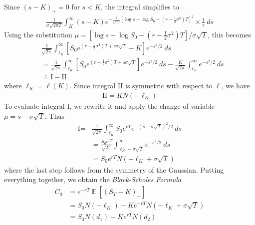 \documentclass[12pt]{article}
\DeclareMathOperator{\ex}{\mathbb{E}}
\theoremstyle{plain}
\theoremstyle{definition}
\theoremstyle{remark}
\numberwithin{equation}{section}  %
\begin{document}
Since ${(s-K)}_{+} = 0$ for $s < K$, the integral simplifies to
\begin{equation*}
\begin{split}
\frac{1}{\sigma \sqrt{2 \pi T}} \int_{K}^{\infty}{(s- K)}
	e^{- \frac{1}{2 \sigma^{2} T} \left[ \log s - \log S_{0} - (r - \frac{1}{2}
	\sigma^{2})T \right]^{2}} \times \frac{1}{s}  \ ds
\end{split}
\end{equation*}
Using the substitution $\mu = \left [ \log s - \log S_{0} - (r - \frac{1}{2}
\sigma^{2})T \right ]/\sigma \sqrt{T}$, this becomes
\begin{equation*}
\begin{split}
	& \frac{1}{\sqrt{2 \pi}} \int_{\ell_{K}}^{\infty}
\left [ S_{0}e^{(r - \frac{1}{2} \sigma^{2})T + s \sigma \sqrt{T}} - K
\right ] e^{-s^{2}/2} \ ds
\\
& =
\frac{1}{\sqrt{2 \pi}} \int_{\ell_{K}}^{\infty}
\left [ S_{0}e^{(r - \frac{1}{2} \sigma^{2})T + s \sigma \sqrt{T}}
\right ] e^{-s^{2}/2} \ ds
- 
\frac{K}{\sqrt{2 \pi}} \int_{\ell_{K}}^{\infty} e^{-s^{2}/2} \ ds
\\
& \doteq \text{I} - \text{II}
\end{split}
\end{equation*}
where $\ell_{K} = \ell(K)$.
Since integral II is symmetric with respect to $\ell$, we have
\begin{equation*}
\begin{split}
	\text{II} = K N(-\ell_{K})
\end{split}
\end{equation*}
To evaluate integral I, we rewrite it and apply the change of 
variable $\mu = s - \sigma \sqrt{T}$. Thus
\begin{equation*}
\begin{split}
	\text{I} = 
	& \frac{1}{\sqrt{2 \pi}} \int_{\ell_{K}}^{\infty}
 S_{0}e^{rT}
 e^{-(s- \sigma \sqrt{T})^{2}/2} \ ds
\\
& = \frac{S_{0} e^{rT}}{\sqrt{2 \pi}} \int_{\ell_{K} - \sigma \sqrt{T}}^{\infty}
e^{-s^{2}/2} \ ds
\\
& = S_{0}e^{rT} N(-\ell_{K} + \sigma \sqrt{T})
\end{split}
\end{equation*}
where the last step follows from the symmetry of the Gaussian.
Putting everything together, we obtain the \emph{Black-Scholes Formula}
\begin{equation*}
\begin{split}
	C_{0} & =  e^{-rT} \ex \left [{\left( S_{T} - K \right)}_{+} \right ]
	\\
	& = S_{0}N(-\ell_{K}) - Ke^{-rT} N(-\ell_{K} + \sigma \sqrt{T})
	\\
	& = S_{0}N(d_{1}) - Ke^{rT} N(d_{2})
\end{split}
\end{equation*}
\end{document}
